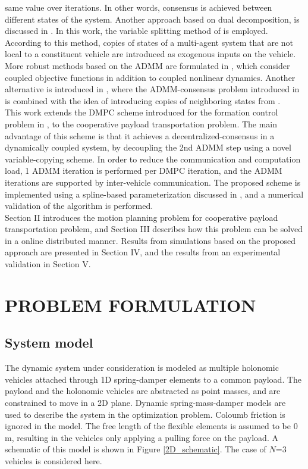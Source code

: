 \documentclass[letterpaper, 10 pt, conference]{ieeeconf}
\begin{document}
 same value over iterations. In other words, consensus is achieved between different states of the system. Another approach based on dual decomposition, is discussed in \cite{c11}. In this work, the variable splitting method of \cite{c8} is employed. According to this method, copies of states of a multi-agent system that are not local to a constituent vehicle are introduced as exogenous inputs on the vehicle. More robust methods based on the ADMM are formulated in \cite{c12}, which consider coupled objective functions in addition to coupled nonlinear dynamics. Another alternative is introduced in \cite{c13}, where the
 ADMM-consensus problem introduced in \cite{c14} is combined with the idea of introducing copies of neighboring states from \cite{c11}.
 \\
 \indent
 This work extends the DMPC scheme introduced for the formation control problem in \cite{c16}, to the cooperative payload transportation problem. The main advantage of this scheme is that it achieves a decentralized-consensus in a dynamically coupled system, by decoupling the 2nd ADMM step using a novel variable-copying scheme. In order to reduce the communication and computation load, 1 ADMM iteration is performed per DMPC iteration, and the ADMM iterations are supported by inter-vehicle communication. The proposed scheme is implemented using a spline-based parameterization discussed in \cite{c16}, and a numerical validation of the algorithm is performed.
\\ \indent
Section  II  introduces  the  motion  planning  problem  for
cooperative payload transportation problem, and Section III describes how
this  problem  can  be  solved  in  a  online distributed manner. Results from simulations based on the proposed approach are presented in Section IV, and the results from an experimental validation in Section V.
\section{PROBLEM FORMULATION}
\subsection{System model}
The dynamic system under consideration is modeled as multiple holonomic vehicles attached through 1D spring-damper elements to a common payload. The payload and the holonomic vehicles are abstracted as point masses, and are constrained to move in a 2D plane. Dynamic spring-mass-damper models are used to describe the system in the optimization problem. Coloumb friction is ignored in the model. The free length of the flexible elements is assumed to be $0$ m, resulting in the vehicles only applying a pulling force on the payload. A schematic of this model is shown in Figure \ref{2D_schematic}. The case of $N$=3 vehicles is considered here.
\end{document}
